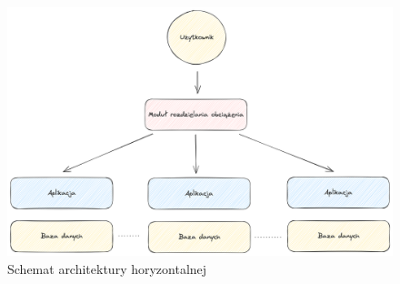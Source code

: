 \begin{figure}[!hb]
	\centering \includegraphics[width=1\linewidth]{rysunki/horizontal_archtecture.png}
	\caption{Schemat architektury horyzontalnej}
	\label{rys:horizontalArchitecture}
\end{figure}
